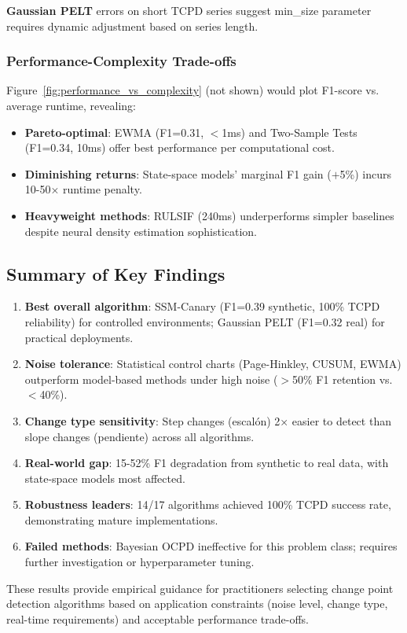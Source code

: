 \textbf{Gaussian PELT} errors on short TCPD series suggest min\_size parameter requires dynamic adjustment based on series length.

\subsubsection{Performance-Complexity Trade-offs}

Figure~\ref{fig:performance_vs_complexity} (not shown) would plot F1-score vs. average runtime, revealing:
\begin{itemize}
    \item \textbf{Pareto-optimal}: EWMA (F1=0.31, $<$1ms) and Two-Sample Tests (F1=0.34, 10ms) offer best performance per computational cost.
    \item \textbf{Diminishing returns}: State-space models' marginal F1 gain ($+$5\%) incurs 10-50× runtime penalty.
    \item \textbf{Heavyweight methods}: RULSIF (240ms) underperforms simpler baselines despite neural density estimation sophistication.
\end{itemize}

\subsection{Summary of Key Findings}

\begin{enumerate}
    \item \textbf{Best overall algorithm}: SSM-Canary (F1=0.39 synthetic, 100\% TCPD reliability) for controlled environments; Gaussian PELT (F1=0.32 real) for practical deployments.
    \item \textbf{Noise tolerance}: Statistical control charts (Page-Hinkley, CUSUM, EWMA) outperform model-based methods under high noise ($>$50\% F1 retention vs. $<$40\%).
    \item \textbf{Change type sensitivity}: Step changes (escalón) 2× easier to detect than slope changes (pendiente) across all algorithms.
    \item \textbf{Real-world gap}: 15-52\% F1 degradation from synthetic to real data, with state-space models most affected.
    \item \textbf{Robustness leaders}: 14/17 algorithms achieved 100\% TCPD success rate, demonstrating mature implementations.
    \item \textbf{Failed methods}: Bayesian OCPD ineffective for this problem class; requires further investigation or hyperparameter tuning.
\end{enumerate}

These results provide empirical guidance for practitioners selecting change point detection algorithms based on application constraints (noise level, change type, real-time requirements) and acceptable performance trade-offs.
